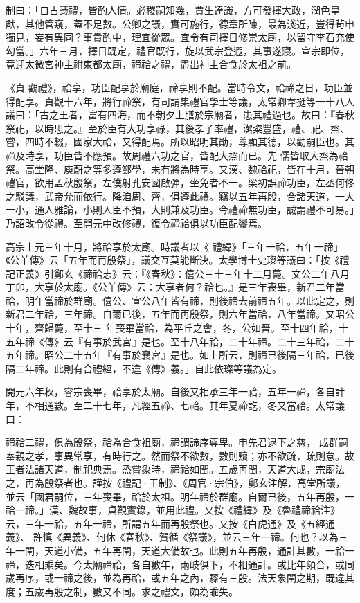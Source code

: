 \begin{pinyinscope}
 制曰：「自古議禮，皆酌人情。必稷嗣知幾，賈生達識，方可發揮大政，潤色皇猷，其他管窺，蓋不足數。公卿之議，實可施行，德章所陳，最為淺近，豈得茍申獨見，妄有異同？事貴酌中，理宜從眾。宜令有司擇日修崇太廟，以留守李石充使勾當。」六年三月，擇日既定，禮官既行，旋以武宗登遐，其事遂寢。宣宗即位，竟迎太微宮神主祔東都太廟，禘祫之禮，盡出神主合食於太祖之前。



 《貞
 觀禮》，祫享，功臣配享於廟庭，禘享則不配。當時令文，祫禘之日，功臣並得配享。貞觀十六年，將行禘祭，有司請集禮官學士等議，太常卿韋挺等一十八人議曰：「古之王者，富有四海，而不朝夕上膳於宗廟者，患其禮過也。故曰：『春秋祭祀，以時思之。』至於臣有大功享祿，其後孝子率禮，潔粢豐盛，禮、祀、烝、嘗，四時不輟，國家大祫，又得配焉。所以昭明其勛，尊顯其德，以勸嗣臣也。其禘及時享，功臣皆不應預。故周禮六功之官，皆配大烝而已。先
 儒皆取大烝為祫祭。高堂隆、庾蔚之等多遵鄭學，未有將為時享。又漢、魏祫祀，皆在十月，晉朝禮官，欲用孟秋殷祭，左僕射孔安國啟彈，坐免者不一。梁初誤禘功臣，左丞何佟之駁議，武帝允而依行。降洎周、齊，俱遵此禮。竊以五年再殷，合諸天道，一大一小，通人雅論，小則人臣不預，大則兼及功臣。今禮禘無功臣，誠謂禮不可易。」乃詔改令從禮。至開元中改修禮，復令禘祫俱以功臣配饗焉。



 高宗上元三年十月，將祫享於太廟。時議者以《
 禮緯》「三年一祫，五年一禘」《公羊傳》云「五年而再殷祭」，議交互莫能斷決。太學博士史璨等議曰：「按《禮記正義》引鄭玄《禘祫志》云：『《春秋》：僖公三十三年十二月薨。文公二年八月丁卯，大享於太廟。《公羊傳》云：大享者何？祫也。』是三年喪畢，新君二年當祫，明年當禘於群廟。僖公、宣公八年皆有禘，則後禘去前禘五年。以此定之，則新君二年祫，三年禘。自爾已後，五年而再殷祭，則六年當祫，八年當禘。又昭公十年，齊歸薨，至十三
 年喪畢當祫，為平丘之會，冬，公如晉。至十四年祫，十五年禘《傳》云『有事於武宮』是也。至十八年祫，二十年禘。二十三年祫，二十五年禘。昭公二十五年『有事於襄宮』是也。如上所云，則禘已後隔三年祫，已後隔二年禘。此則有合禮經，不違《傳》義。」自此依璨等議為定。



 開元六年秋，睿宗喪畢，祫享於太廟。自後又相承三年一祫，五年一禘，各自計年，不相通數。至二十七年，凡經五禘、七祫。其年夏禘訖，冬又當祫。太常議曰：



 禘祫二禮，俱為殷祭，祫為合食祖廟，禘謂諦序尊卑。申先君逮下之慈，
 成群嗣奉親之孝，事異常享，有時行之。然而祭不欲數，數則黷；亦不欲疏，疏則怠。故王者法諸天道，制祀典焉。烝嘗象時，禘祫如閏。五歲再閏，天道大成，宗廟法之，再為殷祭者也。謹按《禮記·王制》、《周官·宗伯》，鄭玄注解，高堂所議，並云「國君嗣位，三年喪畢，祫於太祖。明年禘於群廟。自爾已後，五年再殷，一祫一禘。」漢、魏故事，貞觀實錄，並用此禮。又按《禮緯》及《魯禮禘祫注》云，三年一祫，五年一禘，所謂五年而再殷祭也。又按《白虎通》及《五經通義》、
 許慎《異義》、何休《春秋》、賀循《祭議》，並云三年一禘。何也？以為三年一閏，天道小備，五年再閏，天道大備故也。此則五年再殷，通計其數，一祫一禘，迭相乘矣。今太廟禘祫，各自數年，兩岐俱下，不相通計。或比年頻合，或同歲再序，或一禘之後，並為再祫，或五年之內，驟有三殷。法天象閏之期，既違其度；五歲再殷之制，數又不同。求之禮文，頗為乖失。




\end{pinyinscope}
